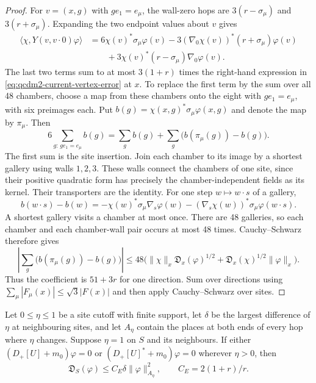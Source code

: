 \documentclass[11pt,letterpaper,reqno]{amsart}
\makeatletter
\theoremstyle{definition}
\newcommand{\ms@minorstart}{%
  \pushQED{\qed}\renewcommand{\qedsymbol}{$\blacksquare$}}
\newenvironment{lemma}[1][]{\ms@minorstart\ms@lemma[#1]}
  {\popQED\endms@lemma}
\theoremstyle{remark}
\makeatother
\begin{document}
\begin{proof}
For $v=(x,g)$ with $ge_1=e_\mu$, the wall-zero hops are
$3(r-\sigma_\mu)$ and $3(r+\sigma_\mu)$.  Expanding the two
endpoint values about $v$ gives
\begin{align*}
 \langle\chi,Y(v,v\cdot0)\varphi\rangle
 &=6\chi(v)^*\sigma_\mu\varphi(v)
  -3(\nabla_0\chi(v))^*(r+\sigma_\mu)\varphi(v)\\
 &\hspace{2em}+3\chi(v)^*(r-\sigma_\mu)\nabla_0\varphi(v).
\end{align*}
The last two terms sum to at most $3(1+r)$ times the
right-hand expression in \eqref{eq:qcdm2-current-vertex-error}
at $x$.  To replace the first term by the sum over all
48 chambers, choose a map from these chambers onto the
eight with $ge_1=e_\mu$, with six preimages each.
Put $b(g)=\chi(x,g)^*\sigma_\mu\varphi(x,g)$ and denote
the map by $\pi_\mu$. Then
\[
 6\sum_{g:\,ge_1=e_\mu}b(g)
 =\sum_gb(g)+\sum_g\bigl(b(\pi_\mu(g))-b(g)\bigr).
\]
The first sum is the site insertion. Join each chamber to
its image by a shortest gallery using walls $1,2,3$.
These walls connect the chambers of one site, since their
positive quadratic form has precisely the chamber-independent
fields as its kernel. Their transporters are the identity.
For one step $w\mapsto w\cdot s$ of a gallery,
\[
 b(w\cdot s)-b(w)
 =-\chi(w)^*\sigma_\mu\nabla_s\varphi(w)
   -(\nabla_s\chi(w))^*\sigma_\mu\varphi(w\cdot s).
\]
A shortest gallery visits a chamber at most once. There are
48 galleries, so each chamber and each chamber-wall pair
occurs at most 48 times. Cauchy--Schwarz therefore gives
\[
 \left|\sum_g\bigl(b(\pi_\mu(g))-b(g)\bigr)\right|
 \le48\bigl(\|\chi\|_x\mathfrak D_x(\varphi)^{1/2}
        +\mathfrak D_x(\chi)^{1/2}\|\varphi\|_x\bigr).
\]
Thus the coefficient is $51+3r$ for one direction.
Sum over directions using $\sum_\mu|F_\mu(x)|\le\sqrt3|F(x)|$
and then apply Cauchy--Schwarz over sites.
\end{proof}

\begin{lemma}[Energy away from the source]\label{C-417-5}
Let $0\le\eta\le1$ be a site cutoff with finite support, let
$\delta$ be the largest difference of $\eta$ at neighbouring
sites, and let $A_\eta$ contain the places at both ends of
every hop where $\eta$ changes.  Suppose $\eta=1$ on $S$
and its neighbours.  If either
$(D_+[U]+m_0)\varphi=0$ or
$(D_+[U]^*+m_0)\varphi=0$ wherever $\eta>0$, then
\begin{equation}\label{eq:qcdm2-Caccioppoli}
 \mathfrak D_S(\varphi)
       \le C_E\delta\|\varphi\|_{A_\eta}^2,
 \qquad C_E=2(1+r)/r.
\end{equation}
\end{lemma}
\end{document}
